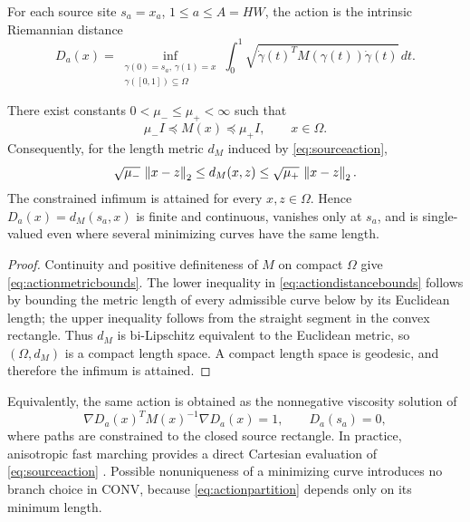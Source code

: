 For each source site \(s_a=x_a\), \(1\leq a\leq A=HW\), the action is the
intrinsic Riemannian distance
\begin{equation}
 D_a(x)=\inf_{\substack{\gamma(0)=s_a,\,\gamma(1)=x\\
                        \gamma([0,1])\subseteq\Omega}}
 \int_0^1\sqrt{\dot\gamma(t)^TM(\gamma(t))\dot\gamma(t)}\,dt.
 \label{eq:sourceaction}
\end{equation}
\begin{proposition}
There exist constants \(0<\mu_-\leq\mu_+<\infty\) such that
\begin{equation}
 \mu_-I\preceq M(x)\preceq\mu_+I,\qquad x\in\Omega.
 \label{eq:actionmetricbounds}
\end{equation}
Consequently, for the length metric \(d_M\) induced by
\eqref{eq:sourceaction},
\begin{equation}
 \sqrt{\mu_-}\,\left\lVert x-z\right\rVert_2
 \leq d_M(x,z)
 \leq \sqrt{\mu_+}\,\left\lVert x-z\right\rVert_2 .
 \label{eq:actiondistancebounds}
\end{equation}
The constrained infimum is attained for every \(x,z\in\Omega\). Hence
\(D_a(x)=d_M(s_a,x)\) is finite and continuous, vanishes only at \(s_a\),
and is single-valued even where several minimizing curves have the same
length.
\end{proposition}

\begin{proof}
Continuity and positive definiteness of \(M\) on compact \(\Omega\) give
\eqref{eq:actionmetricbounds}. The lower inequality in
\eqref{eq:actiondistancebounds} follows by bounding the metric length of
every admissible curve below by its Euclidean length; the upper inequality
follows from the straight segment in the convex rectangle. Thus \(d_M\) is
bi-Lipschitz equivalent to the Euclidean metric, so \((\Omega,d_M)\) is a
compact length space. A compact length space is geodesic, and therefore the
infimum is attained.
\end{proof}

Equivalently, the same action is obtained as the nonnegative viscosity
solution of
\begin{equation}
 \nabla D_a(x)^TM(x)^{-1}\nabla D_a(x)=1,
 \qquad D_a(s_a)=0,
 \label{eq:eikonalpde}
\end{equation}
where paths are constrained to the closed source rectangle. In practice,
anisotropic fast marching provides a direct Cartesian evaluation of
\eqref{eq:sourceaction} \cite{mirebeau2014}.
Possible nonuniqueness of a minimizing curve introduces no branch choice in
CONV, because \eqref{eq:actionpartition} depends only on its minimum length.

